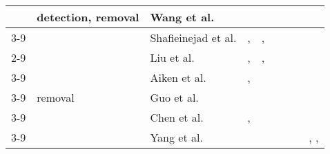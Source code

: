 \begin{sidewaystable}
{\begin{tabular}{lll|l|l|l|l|l|l|}
\multicolumn{1}{|l|}{}                                        & \multicolumn{1}{l|}{\multirow{3}{*}{detection,   removal}} & Wang et al. \cite{wang_attacks_2019} &                     &              &             &              &                 & \cite{uchida_embedding_2017}                       \\ \cline{3-9} 
\multicolumn{1}{|l|}{}                                        & \multicolumn{1}{l|}{}                                      & Shafieinejad et al. \cite{shafieinejad_robustness_2019} & \cite{adi_turning_2018},   \cite{zhang_protecting_2018}        & \cite{guo_watermarking_2018},   \cite{zhang_protecting_2018} & \cite{zhang_protecting_2018} &              &                 &                              \\ \cline{2-9} 
\multicolumn{1}{|l|}{}                                        & \multicolumn{1}{l|}{\multirow{5}{*}{removal}}              & Liu et al. \cite{liu_removing_2020}          & \cite{adi_turning_2018},   \cite{zhang_protecting_2018}        & \cite{guo_watermarking_2018},   \cite{zhang_protecting_2018} & \cite{zhang_protecting_2018}       &              &                 &                              \\ \cline{3-9} 
\multicolumn{1}{|l|}{}                                        & \multicolumn{1}{l|}{}                                      & Aiken et al. \cite{aiken_neural_2020}        & \cite{adi_turning_2018},   \cite{zhang_protecting_2018}        & \cite{zhang_protecting_2018}        & \cite{zhang_protecting_2018}       &              &                 &                              \\ \cline{3-9} 
\multicolumn{1}{|l|}{}                                        & \multicolumn{1}{l|}{}                                      & Guo et al. \cite{guo_hidden_2020}          & \cite{adi_turning_2018}                 & \cite{zhang_protecting_2018}        &             & \cite{merrer_adversarial_2019}       &                 &                              \\ \cline{3-9} 
\multicolumn{1}{|l|}{}                                        & \multicolumn{1}{l|}{}                                      & Chen et al. \cite{chen_refit_2020}        & \cite{adi_turning_2018},   \cite{zhang_protecting_2018}        & \cite{zhang_protecting_2018}        &             & \cite{merrer_adversarial_2019}       & \cite{namba_robust_2019}           &                              \\ \cline{3-9} 
\multicolumn{1}{|l|}{}                                        & \multicolumn{1}{l|}{}                                      & Yang et al. \cite{yang_effectiveness_2019}         &                     &              &             &              &                 & \cite{uchida_embedding_2017},   \cite{rouhani_deepsigns_2019}, \cite{chen_deepmarks_2019} \\ \hline
\end{tabular}
}
\label{tab:attacks}
\end{sidewaystable}



